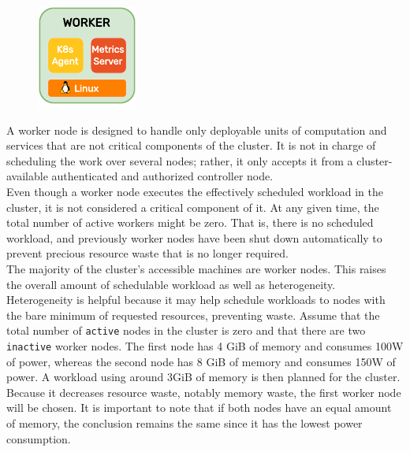 \begin{figure}
  \centering
  \includegraphics[width=\linewidth]{images/architecture/worker.pdf}
\end{figure}

A worker node is designed to handle only deployable units of computation and services
that are not critical components of the cluster. It is not in charge of
scheduling the work over several nodes; rather, it only accepts it from a
cluster-available authenticated and authorized controller node. \\ %
Even though a worker node executes the effectively scheduled workload in the
cluster, it is not considered a critical component of it. At any given time, the
total number of active workers might be zero. That is, there is no scheduled workload,
and previously worker nodes have been shut down automatically to prevent
precious resource waste that is no longer required. \\ %
The majority of the cluster's accessible machines are worker nodes. This raises the
overall amount of schedulable workload as well as heterogeneity. Heterogeneity
is helpful because it may help schedule workloads to nodes with the bare minimum
of requested resources, preventing waste. Assume that the total number of
\texttt{active} nodes in the cluster is zero and that there are two \texttt{inactive}
worker nodes. The first node has 4 GiB of memory and consumes 100W of power,
whereas the second node has 8 GiB of memory and consumes 150W of power. A workload
using around 3GiB of memory is then planned for the cluster. Because it
decreases resource waste, notably memory waste, the first worker node will be
chosen. It is important to note that if both nodes have an equal amount of memory,
the conclusion remains the same since it has the lowest power consumption.

